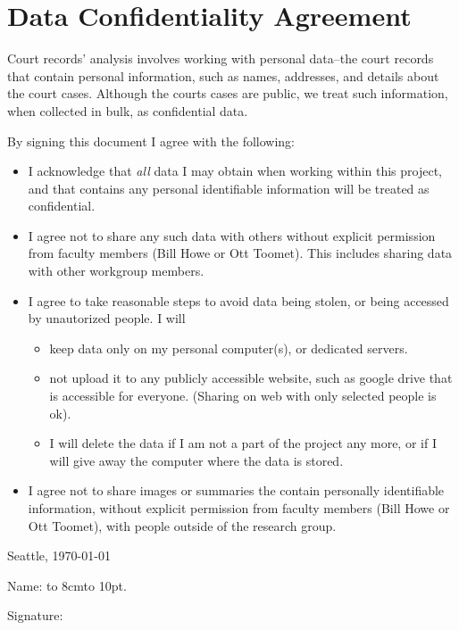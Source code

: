 \documentclass[12pt]{article}
\begin{document}
\section*{Data Confidentiality Agreement}

Court records' analysis involves working with personal data--the court
records that contain personal information, such as names, addresses,
and details about the court cases.  Although the courts cases are
public, we treat such information, when collected in bulk, as
confidential data.

By signing this document I agree with the following:
\begin{itemize}
\item I acknowledge that \emph{all}  data I may obtain when working
  within this project, and that contains any personal identifiable
  information will be treated as confidential.
\item I agree not to share any such data with others without explicit
  permission from faculty members (Bill Howe or Ott Toomet).  This
  includes sharing data with other workgroup members.
\item I agree to take reasonable steps to avoid data being stolen, or
  being accessed by unautorized people.  I will
  \begin{itemize}
  \item keep data only on my personal computer(s), or dedicated
    servers. 
  \item not upload it to any publicly accessible website, such as
    google drive that is accessible for everyone.  (Sharing on web
    with only selected people is ok).
  \item I will delete the data if I am not a part of the project any
    more, or if I will give away the computer where the
    data is stored. 
  \end{itemize}
\item I agree not to share images or summaries the contain
  personally identifiable information, without
  explicit permission from faculty members (Bill Howe or Ott Toomet),
  with people
  outside of the research group.
\end{itemize}

\bigskip

Seattle, \today

\vspace{15mm}

Name: \hbox to 8cm{\leaders\hbox to 10pt{\hss . \hss}\hfil}


\vspace{15mm}

Signature:




\end{document}
